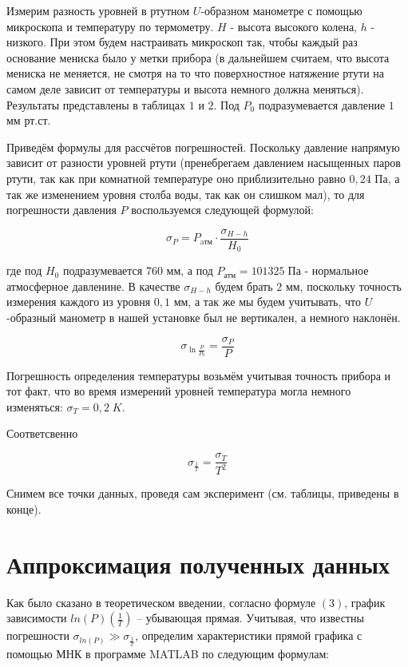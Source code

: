 Измерим разность уровней в ртутном $U$-образном манометре с помощью микроскопа и температуру по термометру. $H$ - высота высокого колена, $h$ - низкого. При этом будем настраивать микроскоп так, чтобы каждый раз основание мениска было у метки прибора (в дальнейшем считаем, что высота мениска не меняется, не смотря на то что поверхностное натяжение ртути на самом деле зависит от температуры и высота немного должна меняться). Результаты представлены в таблицах $1$ и $2$. Под $P_0$ подразумевается давление $1$ мм рт.ст.

Приведём формулы для рассчётов погрешностей.
Поскольку давление напрямую зависит от разности уровней ртути (пренебрегаем давлением насыщенных паров ртути, так как при комнатной температуре оно приблизительно равно $0,24$ Па, а так же изменением уровня столба воды, так как он слишком мал), то для погрешности давления $P$ воспользуемся следующей формулой: 

\begin{equation}
	\sigma_P = P_{\text{aтм}} \cdot \frac{\sigma_{H-h}}{H_0}
\end{equation}

где под $H_0$ подразумевается $760$ мм, а под $P_{\text{атм}} = 101325 \; \text{Па}$ - нормальное атмосферное давленине. В качестве $\sigma_{H-h}$ будем брать $2$ мм, поскольку точность измерения каждого из уровня $0,1$ мм, а так же мы будем учитывать, что $U$-образный манометр в нашей установке был не вертикален, а немного наклонён.

\begin{equation}
	\sigma_{\ln{\frac{P}{P_0}}} = \frac{\sigma_P}{P}
\end{equation}

Погрешность определения температуры возьмём учитывая точность прибора и тот факт, что во время измерений уровней температура могла немного изменяться: $\sigma_{T} = 0,2 \; K$.

Соответсвенно

\begin{equation}
	\sigma_{\frac{1}{T}} = \frac{\sigma_T}{T^2}
\end{equation}

Снимем все точки данных, проведя сам эксперимент (см. таблицы, приведены в конце).

\section{Аппроксимация полученных данных}

Как было сказано в теоретическом введении, согласно формуле $(3)$, график зависимости $ln(P)\left( \frac{1}{T}\right)$ -- убывающая прямая. Учитывая, что известны погрешности $\sigma_{ln(P)} \gg \sigma_{\frac{1}{T}}$, определим характеристики прямой графика с помощью МНК в программе MATLAB по следующим формулам:

